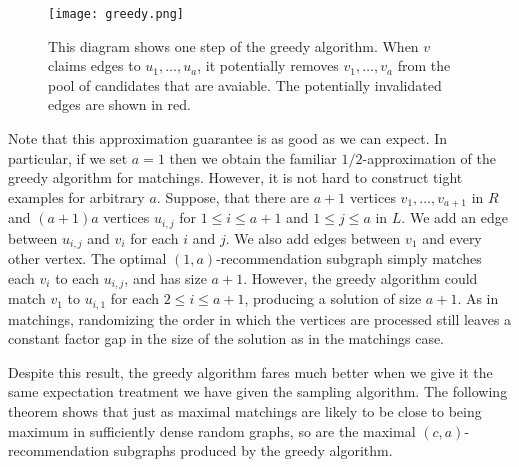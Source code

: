 \begin{figure}[h]
\centering
\texttt{[image: greedy.png]}
\begin{minipage}[h]{.8\linewidth}
\caption{This diagram shows one step of the greedy algorithm. When $v$ claims edges to $u_1,\ldots, u_a$, it potentially removes $v_1,\ldots, v_a$ from the pool of candidates that are avaiable. The potentially invalidated edges are shown in red.}
\end{minipage}
\end{figure}

Note that this approximation guarantee is as good as we can expect.
In particular, if we set $a=1$ then we obtain the familiar
$1/2$-approximation of the greedy algorithm for matchings. However,
it is not hard to construct tight examples for arbitrary $a$. Suppose,
that there are $a+1$ vertices $v_1,\ldots,v_{a+1}$ in $R$ and $(a+1)a$ 
vertices $u_{i,j}$ for $1\leq i\leq a+1$ and $1\leq j \leq a$ in $L$.
We add an edge between $u_{i,j}$ and $v_{i}$ for each $i$ and $j$.
We also add edges between $v_1$ and every other vertex. The optimal
$(1,a)$-recommendation subgraph simply matches each $v_i$ to each
$u_{i,j}$, and has size $a+1$. However, the greedy algorithm
could match $v_1$ to $u_{i,1}$ for each $2\leq i\leq a+1$, producing
a solution of size $a+1$. As in matchings, randomizing the order in
which the vertices are processed still leaves a constant factor gap
in the size of the solution as in the matchings case.
\cite{KarpVaziraniVazirani1990}

Despite this result, the greedy algorithm fares much better when we
give it the same expectation treatment we have given the sampling 
algorithm. The following theorem shows that just as maximal matchings
are likely to be close to being maximum in sufficiently dense random
graphs, so are the maximal $(c,a)$-recommendation subgraphs produced
by the greedy algorithm.

